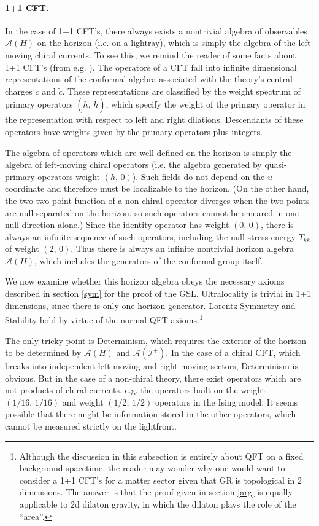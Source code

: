 \documentclass{article}
\begin{document}
\paragraph{\textbf{1+1 CFT}.} In the case of 1+1 CFT's, there always exists a nontrivial algebra of observables $\mathcal{A}(H)$ on the horizon (i.e. on a lightray), which is simply the algebra of the left-moving chiral currents.  To see this, we remind the reader of some facts about 1+1 CFT's (from e.g. \cite{ginsparg89}).  The operators of a CFT fall into infinite dimensional representations of the conformal algebra associated with the theory's central charges $c$ and $\tilde{c}$.  These representations are classified by the weight spectrum of primary operators $(h,\,\tilde{h})$, which specify the weight of the primary operator in the representation with respect to left and right dilations.  Descendants of these operators have weights given by the primary operators plus integers.

The algebra of operators which are well-defined on the horizon is simply the algebra of left-moving chiral operators (i.e. the algebra generated by quasi-primary operators weight $(h,\,0)$).  Such fields do not depend on the $u$ coordinate and therefore must be localizable to the horizon.  (On the other hand, the two two-point function of a non-chiral operator diverges when the two points are null separated on the horizon, so such operators cannot be smeared in one null direction alone.)  Since the identity operator has weight $(0,\,0)$, there is always an infinite sequence of such operators, including the null stress-energy $T_{kk}$ of weight $(2,\,0)$.  Thus there is always an infinite nontrivial horizon algebra $\mathcal{A}(H)$, which includes the generators of the conformal group itself.

We now examine whether this horizon algebra obeys the necessary axioms described in section \ref{sym} for the proof of the GSL.  Ultralocality is trivial in 1+1 dimensions, since there is only one horizon generator.  Lorentz Symmetry and Stability hold by virtue of the normal QFT axioms.\footnote{Although the discussion in this subsection is entirely about QFT on a fixed background spacetime, the reader may wonder why one would want to consider a 1+1 CFT's for a matter sector given that GR is topological in 2 dimensions.  The answer is that the proof given in section \ref{arg} is equally applicable to 2d dilaton gravity, in which the dilaton plays the role of the  ``area''.}

The only tricky point is Determinism, which requires the exterior of the horizon to be determined by $\mathcal{A}(H)$ and $\mathcal{A}(\mathcal{I}^+)$.  In the case of a chiral CFT, which breaks into independent left-moving and right-moving sectors, Determinism is obvious.  But in the case of a non-chiral theory, there exist operators which are not products of chiral currents, e.g. the operators built on the weight $(1/16,\,1/16)$ and weight $(1/2,\,1/2)$ operators in the Ising model.  It seems possible that there might be information stored in the other operators, which cannot be measured strictly on the lightfront.
\end{document}
